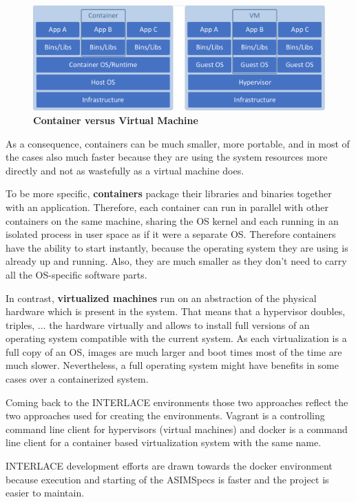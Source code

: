 \begin{figure}[htbp]
  \centering
  \includegraphics[width=1.0\textwidth, clip, trim=1mm 1mm 1mm 1mm]{Figures/container_vs_vm}
  \caption{\bf\small Container versus Virtual Machine}
  \label{fig:docker-env-container-vs-vm}
\end{figure}

As a consequence, containers can be much smaller, more portable, and in most of the cases also much faster because they are using the system resources more directly and not as wastefully as a virtual machine does.

To be more specific, \textbf{containers} package their libraries and binaries together with an application. Therefore, each container can run in parallel with other containers on the same machine, sharing the OS kernel and each running in an isolated process in user space as if it were a separate OS. Therefore containers have the ability to start instantly, because the operating system they are using is already up and running. Also, they are much smaller as they don't need to carry all the OS-specific software parts.

In contrast, \textbf{virtualized machines} run on an abstraction of the physical hardware which is present in the system. That means that a hypervisor doubles, triples, ... the hardware virtually and allows to install full versions of an operating system compatible with the current system. As each virtualization is a full copy of an OS, images are much larger and boot times most of the time are much slower. Nevertheless, a full operating system might have benefits in some cases over a containerized system.

Coming back to the INTERLACE environments those two approaches reflect the two approaches used for creating the environments. Vagrant is a controlling command line client for hypervisors (virtual machines) and docker is a command line client for a container based virtualization system with the same name.

INTERLACE development efforts are drawn towards the docker environment because execution and starting of the ASIMSpecs is faster and the project is easier to maintain.
